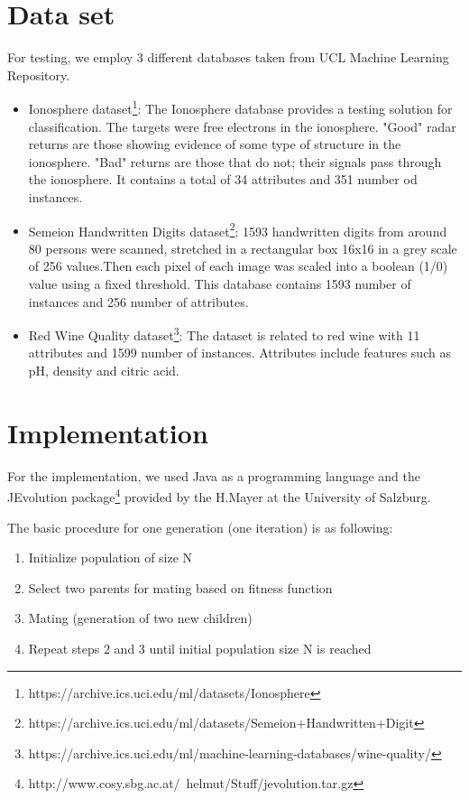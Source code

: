 \documentclass[11pt,onecolumn,a4paper]{article}
\begin{document}
\section{Data set}
\label{sec:eval}
For testing, we employ 3 different databases taken from UCL Machine Learning Repository. 

\begin{itemize}
	\item Ionosphere dataset\footnote{https://archive.ics.uci.edu/ml/datasets/Ionosphere}: The Ionosphere database  provides a testing solution for classification.  The targets were free electrons in the ionosphere. "Good" radar returns are those showing evidence of some type of structure in the ionosphere. "Bad" returns are those that do not; their signals pass through the ionosphere. It contains a total of 34 attributes and 351 number od instances. 
	
	\item Semeion Handwritten Digits dataset\footnote{https://archive.ics.uci.edu/ml/datasets/Semeion+Handwritten+Digit}: 1593 handwritten digits from around 80 persons were scanned, stretched in a rectangular box 16x16 in a grey scale of 256 values.Then each pixel of each image was scaled into a boolean (1/0) value using a fixed threshold. This database contains 1593 number of instances and 256 number of attributes.
	\item Red Wine Quality dataset\footnote{https://archive.ics.uci.edu/ml/machine-learning-databases/wine-quality/}: The dataset is related to red wine with 11 attributes and 1599 number of instances. Attributes include features such as pH, density and citric acid.
\end{itemize}



\section{Implementation}
\label{sec:eval}

For the implementation, we used Java as a programming language and the JEvolution package\footnote{http://www.cosy.sbg.ac.at/~helmut/Stuff/jevolution.tar.gz} provided by the H.Mayer at the University of Salzburg.

The basic procedure for one generation (one iteration) is as following:

\begin{enumerate}
\item {Initialize population of size N}
\item {Select two parents for mating based on fitness function}
\item {Mating (generation of two new children)}
\item{Repeat steps 2 and 3 until initial population size N is reached}
\end{enumerate}   
\end{document}
